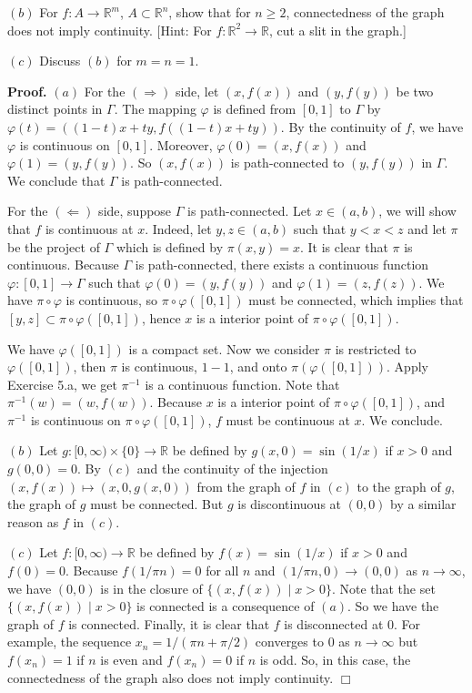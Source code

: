 \documentclass{article}
\begin{document}
$(b)$ For $f:A\to \mathbb{R}^m$, $A\subset \mathbb{R}^n$, show that for
$n\ge 2$, connectedness of the graph does not imply continuity. {[}Hint:
For $f:\mathbb{R}^2 \to \mathbb{R}$, cut a slit in the graph.{]}

$(c)$ Discuss $(b)$ for $m=n=1$.

\textbf{Proof.} $(a)$ For the $(\Rightarrow)$ side, let $(x,f(x))$ and
$(y,f(y))$ be two distinct points in $\Gamma$. The mapping $\varphi$ is
defined from $[0,1]$ to $\Gamma$ by
$\varphi(t) = ((1-t)x + ty,f((1-t)x+ty))$. By the continuity of $f$, we
have $\varphi$ is continuous on $[0,1]$. Moreover,
$\varphi(0) = (x,f(x))$ and $\varphi(1) = (y,f(y))$. So $(x,f(x))$ is
path-connected to $(y,f(y))$ in $\Gamma$. We conclude that $\Gamma$ is
path-connected.

For the $(\Leftarrow)$ side, suppose $\Gamma$ is path-connected. Let
$x\in (a,b)$, we will show that $f$ is continuous at $x$. Indeed, let
$y, z \in (a,b)$ such that $y < x < z$ and let $\pi$ be the project of
$\Gamma$ which is defined by $\pi(x,y) = x$. It is clear that $\pi$ is
continuous. Because $\Gamma$ is path-connected, there exists a
continuous function $\varphi:[0,1]\to \Gamma$ such that
$\varphi(0) = (y,f(y))$ and $\varphi(1) = (z,f(z))$. We have
$\pi\circ \varphi$ is continuous, so $\pi\circ \varphi([0,1])$ must be
connected, which implies that $[y,z]\subset \pi\circ \varphi([0,1])$,
hence $x$ is a interior point of $\pi\circ \varphi([0,1])$.

We have $\varphi([0,1])$ is a compact set. Now we consider $\pi$ is
restricted to $\varphi([0,1])$, then $\pi$ is continuous, $1-1$, and
onto $\pi(\varphi([0,1]))$. Apply Exercise 5.a, we get $\pi^{-1}$ is a
continuous function. Note that $\pi^{-1}(w) = (w,f(w))$. Because $x$ is
a interior point of $\pi\circ \varphi([0,1])$, and $\pi^{-1}$ is
continuous on $\pi\circ \varphi([0,1])$, $f$ must be continuous at $x$.
We conclude.

$(b)$ Let $g:[0,\infty)\times \{0\} \to \mathbb{R}$ be defined by
$g(x,0) = \sin(1/x)$ if $x > 0$ and $g(0,0) = 0$. By $(c)$ and the
continuity of the injection $(x,f(x)) \mapsto (x,0,g(x,0))$ from the
graph of $f$ in $(c)$ to the graph of $g$, the graph of $g$ must be
connected. But $g$ is discontinuous at $(0,0)$ by a similar reason as
$f$ in $(c)$.

$(c)$ Let $f:[0,\infty)\to \mathbb{R}$ be defined by $f(x) = \sin(1/x)$
if $x > 0$ and $f(0) = 0$. Because $f(1/\pi n) = 0$ for all $n$ and
$(1/\pi n, 0) \to (0,0)$ as $n\to\infty$, we have $(0,0)$ is in the
closure of $\{(x,f(x))\mid x > 0\}$. Note that the set
$\{(x,f(x))\mid x > 0\}$ is connected is a consequence of $(a)$. So we
have the graph of $f$ is connected. Finally, it is clear that $f$ is
disconnected at $0$. For example, the sequence $x_n = 1/(\pi n +\pi/2)$
converges to $0$ as $n\to \infty$ but $f(x_n) = 1$ if $n$ is even and
$f(x_n) = 0$ if $n$ is odd. So, in this case, the connectedness of the
graph also does not imply continuity. $\Box$
\end{document}
